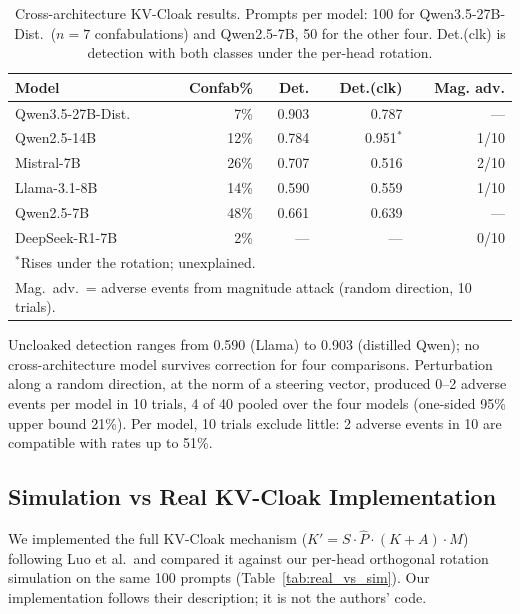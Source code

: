 \begin{table}[h]
\centering
\caption{Cross-architecture KV-Cloak results. Prompts per model: 100 for Qwen3.5-27B-Dist.\ ($n=7$ confabulations) and Qwen2.5-7B, 50 for the other four. Det.(clk) is detection with both classes under the per-head rotation.}
\label{tab:cross_arch}
\begin{tabular}{lrrrr}
\toprule
Model & Confab\% & Det. & Det.(clk) & Mag. adv. \\
\midrule
Qwen3.5-27B-Dist. & 7\% & 0.903 & 0.787 & --- \\
Qwen2.5-14B & 12\% & 0.784 & 0.951$^*$ & 1/10 \\
Mistral-7B & 26\% & 0.707 & 0.516 & 2/10 \\
Llama-3.1-8B & 14\% & 0.590 & 0.559 & 1/10 \\
Qwen2.5-7B & 48\% & 0.661 & 0.639 & --- \\
DeepSeek-R1-7B & 2\% & --- & --- & 0/10 \\
\bottomrule
\multicolumn{5}{l}{\footnotesize $^*$Rises under the rotation; unexplained.} \\
\multicolumn{5}{l}{\footnotesize Mag.\ adv.\ = adverse events from magnitude attack (random direction, 10 trials).}
\end{tabular}
\end{table}

Uncloaked detection ranges from 0.590 (Llama) to 0.903 (distilled Qwen);
no cross-architecture model survives correction for four comparisons.
Perturbation along a random direction, at the norm of a steering vector,
produced 0--2 adverse events per model in 10 trials, 4 of 40 pooled over the four
models (one-sided 95\% upper bound 21\%). Per model, 10 trials exclude
little: 2 adverse events in 10 are compatible with rates up to 51\%.

\subsection{Simulation vs Real KV-Cloak Implementation}
\label{sec:real}

We implemented the full KV-Cloak mechanism
($K' = S \cdot \hat{P} \cdot (K + A) \cdot M$) following
Luo et al.\ and compared it against our per-head orthogonal rotation
simulation on the same 100 prompts (Table~\ref{tab:real_vs_sim}). Our
implementation follows their description; it is not the authors' code.

